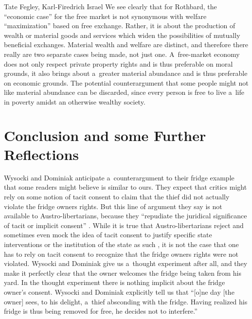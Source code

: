 \begin{artengenv2auth}{Tate Fegley, Karl-Firedrich Israel}
We see clearly that for Rothbard, the ``economic case'' for the free market is not synonymous with welfare ``maximization'' based on free exchange. Rather, it is about the production of wealth or material goods and services which widen the possibilities of mutually beneficial exchanges. Material wealth and welfare are distinct, and therefore there really are two separate cases being made, not just one. A~free-market economy does not only respect private property rights and is thus preferable on moral grounds, it also brings about a~greater material abundance and is thus preferable on economic grounds. The potential counterargument that some people might not like material abundance can be discarded, since every person is free to live a~life in poverty amidst an otherwise wealthy society.



\section{Conclusion and some Further Reflections}

Wysocki and Dominiak 
\parencite*[][pp.58–59]{wysocki_how_2023} %
 anticipate a~counterargument to their fridge example that some readers might believe is similar to ours. They expect that critics might rely on some notion of tacit consent to claim that the thief did not actually violate the fridge owners rights. But this line of argument they say is not available to Austro-libertarians, because they ``repudiate the juridical significance of tacit or implicit consent'' 
\parencite[][p.58]{wysocki_how_2023}. %
 While it is true that Austro-libertarians reject and sometimes even mock the idea of tacit consent to justify specific state interventions or the institution of the state as such 
\parencite[][]{hoppe_economics_2006}, %
 it is not the case that one has to rely on tacit consent to recognize that the fridge owners rights were not violated. Wysocki and Dominiak give us a~thought experiment after all, and they make it perfectly clear that the owner welcomes the fridge being taken from his yard. In the thought experiment there is nothing implicit about the fridge owner's consent. Wysocki and Dominiak 
\parencite*[][p.58]{wysocki_how_2023} %
 explicitly tell us that ``[o]ne day [the owner] sees, to his delight, a~thief absconding with the fridge. Having realized his fridge is thus being removed for free, he decides not to interfere.''




\end{artengenv2auth}
